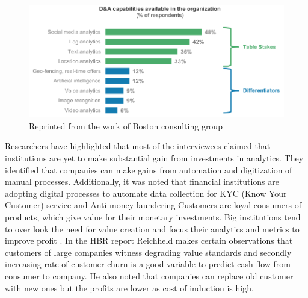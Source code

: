 \begin{figure}[H]
	\includegraphics[scale = 0.5]{figures/DA_capabilities.png}
	\caption[Da capablities]{Reprinted from the work of Boston consulting group  }
	\label{fig:da_capabilities}
\end{figure}
\FloatBarrier

Researchers have highlighted that most of the interviewees claimed that institutions are yet to make substantial gain from investments in analytics. They identified that companies can make gains from automation and digitization of manual processes. Additionally, it was noted that financial institutions are adopting digital processes to automate data collection for KYC (Know Your Customer) service and Anti-money laundering 
Customers are loyal consumers of products, which give value for their monetary investments. Big institutions tend to over look the need for value creation and focus their analytics and metrics to improve profit . In the HBR report Reichheld makes certain  observations that customers of large companies witness degrading value standards and secondly increasing rate of customer churn is a good variable to predict cash flow from consumer to company. He also noted that companies can replace old customer with new ones but the profits are lower as cost of induction is high.

